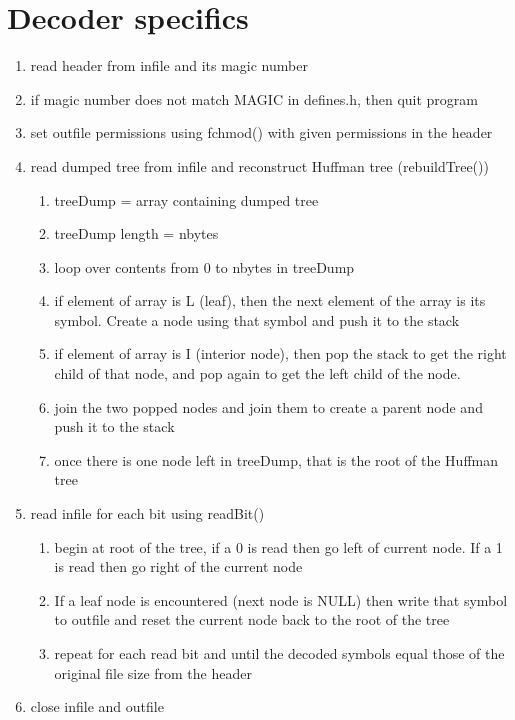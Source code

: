\documentclass[11pt]{article}
\begin{document}
\section{Decoder specifics}\label{ss:decoder}
\begin{enumerate}
\item read header from infile and its magic number
\item if magic number does not match MAGIC in defines.h, then quit program
\item set outfile permissions using fchmod() with given permissions in the header
\item read dumped tree from infile and reconstruct Huffman tree (rebuildTree())
	\begin{enumerate}
	\item treeDump = array containing dumped tree
	\item treeDump length = nbytes
	\item loop over contents from 0 to nbytes in treeDump
	\item if element of array is L (leaf), then the next element of the array is its symbol. Create a node using that symbol and push it to the stack
	\item if element of array is I (interior node), then pop the stack to get the right child of that node, and pop again to get the left child of the node.
	\item join the two popped nodes and join them to create a parent node and push it to the stack
	\item once there is one node left in treeDump, that is the root of the Huffman tree
	\end{enumerate}
\item read infile for each bit using readBit()
	\begin{enumerate}
	\item begin at root of the tree, if a 0 is read then go left of current node. If a 1 is read then go right of the current node
	\item If a leaf node is encountered (next node is NULL) then write that symbol to outfile and reset the current node back to the root of the tree
	\item repeat for each read bit and until the decoded symbols equal those of the original file size from the header
	\end{enumerate}
\item close infile and outfile
\end{enumerate}
\end{document}
